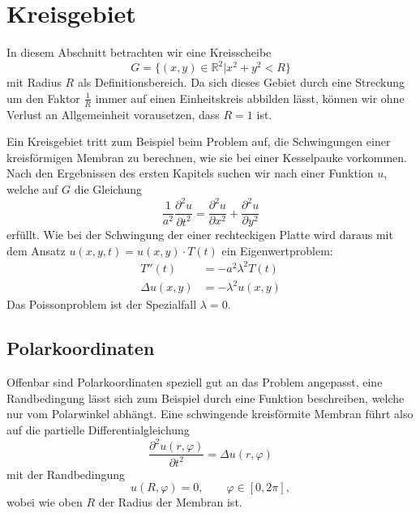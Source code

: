 \section{Kreisgebiet}
In diesem Abschnitt betrachten wir eine Kreisscheibe
\[
G=\{(x,y)\in\mathbb R^2|x^2+y^2 < R\}
\]
mit Radius $R$ als Definitionsbereich. Da sich dieses Gebiet durch
eine Streckung um den Faktor $\frac1R$ immer auf einen Einheitskreis
abbilden lässt, können wir ohne Verlust an Allgemeinheit vorausetzen,
dass $R=1$ ist.

Ein Kreisgebiet tritt zum Beispiel beim Problem auf, die Schwingungen
einer kreisförmigen Membran zu berechnen, wie sie bei einer Kesselpauke
vorkommen. Nach den Ergebnissen des ersten Kapitels suchen wir nach einer
Funktion $u$, welche auf $G$ die Gleichung
\[
\frac1{a^2}\frac{\partial^2 u}{\partial t^2}=\frac{\partial^2 u}{\partial x^2}+\frac{\partial^2 u}{\partial y^2}
\]
erfüllt. Wie bei der Schwingung der einer rechteckigen Platte
wird daraus mit dem Ansatz $ u(x,y,t)=u(x,y)\cdot T(t)$ ein
Eigenwertproblem:
\begin{align*}
T''(t)&=-a^2\lambda^2 T(t)\\
\Delta u(x,y)&=-\lambda^2u(x,y)
\end{align*}
Das Poissonproblem ist der Spezialfall $\lambda=0$.

\subsection{Polarkoordinaten}
Offenbar sind Polarkoordinaten speziell gut an das Problem angepasst, 
eine Randbedingung lässt sich zum Beispiel durch eine Funktion beschreiben,
welche nur vom Polarwinkel abhängt.
Eine schwingende kreisförmite Membran führt also auf die partielle
Differentialgleichung
\[
\frac{\partial^2u(r,\varphi)}{\partial t^2}=\Delta u(r,\varphi)
\]
mit der Randbedingung
\[
u(R,\varphi)=0,\qquad\varphi\in[0,2\pi],
\]
wobei wie oben $R$ der Radius der Membran ist.

